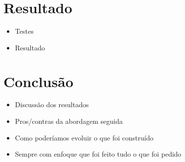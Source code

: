 \documentclass[11pt,a4paper]{report}
\begin{document}
\chapter{Resultado}
\begin{itemize}
    \item Testes
    \item Resultado
\end{itemize}


\chapter{Conclusão}
\begin{itemize}
    \item Discussão dos resultados
    \item Pros/contras da abordagem seguida
    \item Como poderíamos evoluir o que foi construído
    \item Sempre com enfoque que foi feito tudo o que foi pedido
\end{itemize}
\end{document}
